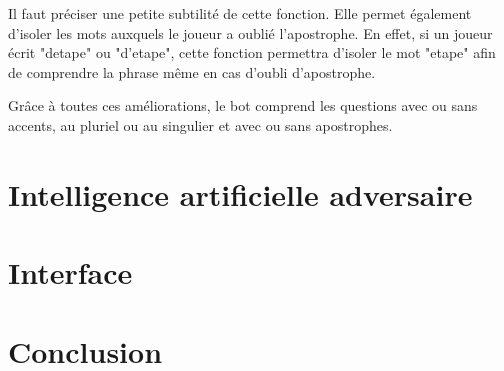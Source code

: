 \documentclass[a4paper, 11pt]{article}
\begin{document}
Il faut préciser une petite subtilité de cette fonction. Elle permet également d'isoler les mots auxquels le joueur a oublié l'apostrophe. En effet, si un joueur écrit "detape" ou "d'etape", cette fonction permettra d'isoler le mot "etape" afin de comprendre la phrase même en cas d'oubli d'apostrophe.\newline

Grâce à toutes ces améliorations, le bot comprend les questions avec ou sans accents, au pluriel ou au singulier et avec ou sans apostrophes.

\newpage

\section{Intelligence artificielle adversaire}

\newpage

\section{Interface}

\newpage

\section{Conclusion}
\end{document}
